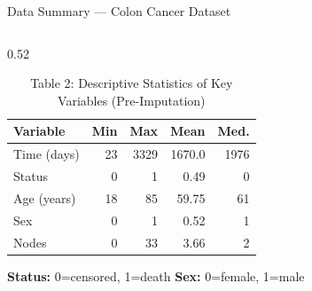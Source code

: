 \documentclass[aspectratio=169, 11pt]{beamer}
\begin{document}
\begin{frame}{Data Summary --- Colon Cancer Dataset}
\begin{columns}[T]
  \begin{column}{0.52\textwidth}
    \vspace{2pt}
    \begin{table}
      \caption{Table 2: Descriptive Statistics of Key
               Variables (Pre-Imputation)}
      \small
      \begin{tabular}{@{}lrrrr@{}}
        \toprule
        \textbf{Variable} & \textbf{Min} & \textbf{Max}
          & \textbf{Mean} & \textbf{Med.}\\
        \midrule
        Time (days) & 23  & 3329 & 1670.0 & 1976 \\
        Status      & 0   & 1    & 0.49   & 0    \\
        Age (years) & 18  & 85   & 59.75  & 61   \\
        Sex         & 0   & 1    & 0.52   & 1    \\
        Nodes       & 0   & 33   & 3.66   & 2    \\
        \bottomrule
      \end{tabular}
    \end{table}
    \vspace{3pt}
    \footnotesize
    \textbf{Status:} 0=censored, 1=death\quad
    \textbf{Sex:} 0=female, 1=male
  \end{column}

\end{columns}
\end{frame}
\end{document}
